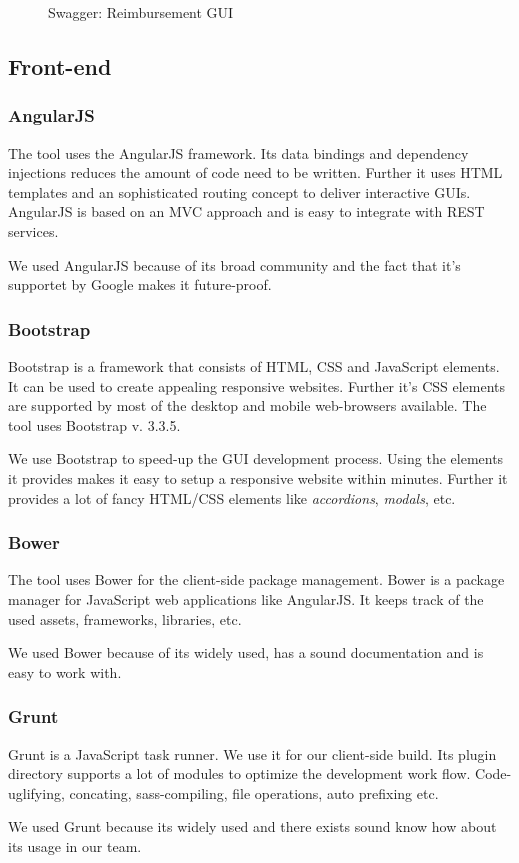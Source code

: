 \begin{figure}[H]
    \centering
    \caption{Swagger: Reimbursement GUI}
    \label{fig:swagger01}
\end{figure}

\subsection{Front-end}

\subsubsection{AngularJS}
The tool uses the AngularJS framework. Its data bindings and dependency injections reduces the amount of code need to be written. Further it uses HTML templates and an sophisticated routing concept to deliver interactive GUIs. AngularJS is based on an MVC approach and is easy to integrate with REST services.\cite{angular}\par
We used AngularJS because of its broad community and the fact that it's supportet by Google makes it future-proof.

\subsubsection{Bootstrap}
Bootstrap is a framework that consists of HTML, CSS and JavaScript elements. It can be used to create appealing responsive websites. Further it's CSS elements are supported by most of the desktop and mobile web-browsers available. The tool uses Bootstrap v. 3.3.5. \cite{bootstrap}\par
We use Bootstrap to speed-up the GUI development process. Using the elements it provides makes it easy to setup a responsive website within minutes. Further it provides a lot of fancy HTML/CSS elements like \textit{accordions}, \textit{modals}, etc.

\subsubsection{Bower}
The tool uses Bower for the client-side package management. Bower is a package manager for JavaScript web applications like AngularJS. It keeps track of the used assets, frameworks, libraries, etc. \cite{bower} \par
We used Bower because of its widely used, has a sound documentation and is easy to work with.

\subsubsection{Grunt}
Grunt is a JavaScript task runner. We use it for our client-side build. Its plugin directory supports a lot of modules to optimize the development work flow. Code-uglifying, concating, sass-compiling, file operations, auto prefixing etc. \cite{grunt} \par
We used Grunt because its widely used and there exists sound know how about its usage in our team.
